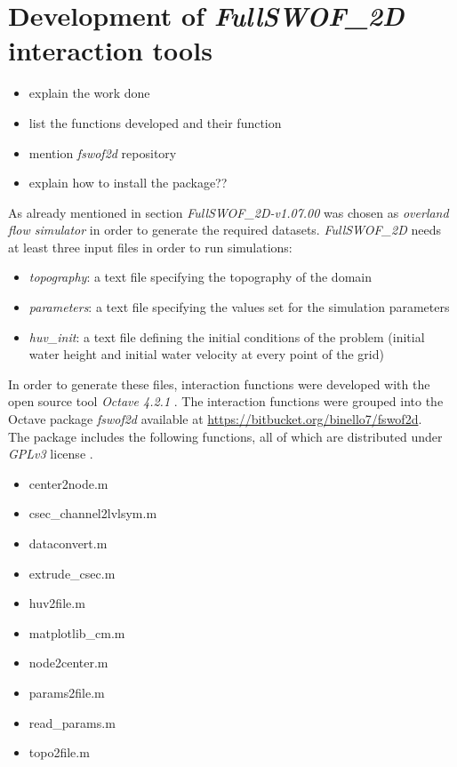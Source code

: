 \section{Development of \textit{FullSWOF\_2D} interaction tools}

\begin{itemize}
\itemsep0em
  \item explain the work done
  \item list the functions developed and their function
  \item mention \textit{fswof2d} repository
  \item explain how to install the package?? 
\end{itemize}

As already mentioned in section  \textit{FullSWOF\_2D-v1.07.00} was chosen as \emph{overland flow simulator} in order to generate the required datasets.
\textit{FullSWOF\_2D} needs at least three input files in order to run simulations:

\begin{itemize}
\itemsep0em
  \item \textit{topography}: a text file specifying the topography of the domain
  \item \textit{parameters}: a text file specifying the values set for the simulation parameters
  \item \textit{huv\_init}: a text file defining the initial conditions of the problem (initial water height and initial water velocity at every point of the grid)
\end{itemize}

In order to generate these files, interaction functions were developed with the open source tool \textit{Octave 4.2.1} \autocite{octave_community_gnu_2018}.
The interaction functions were grouped into the Octave package \textit{fswof2d} available at \url{https://bitbucket.org/binello7/fswof2d}.\\

The package includes the following functions, all of which are distributed under \textit {GPLv3} license \autocite{smith_quick_2014}.

\begin{itemize}
\itemsep0em
  \item center2node.m
  \item csec\_channel2lvlsym.m
  \item dataconvert.m
  \item extrude\_csec.m
  \item huv2file.m
  \item matplotlib\_cm.m
  \item node2center.m
  \item params2file.m
  \item read\_params.m
  \item topo2file.m
\end{itemize}

